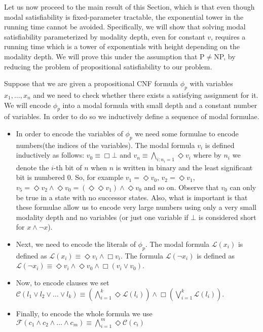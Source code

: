 \documentclass{llncs}
\begin{document}
Let us now proceed to the main result of this Section, which is that even
though modal satisfiability is fixed-parameter tractable, the exponential tower
in the running time cannot be avoided. Specifically, we will show that solving
modal satisfiability parameterized by modality depth, even for constant $v$, 
requires a running time which is a tower of exponentials with height depending
on the modality depth. We will prove this under the assumption that P$\neq$NP,
by reducing the problem of propositional satisfiability to our problem.

Suppose that we are given a propositional CNF formula $\phi_p$ with variables
$x_1,\ldots,x_n$ and we need to check whether there exists a satisfying
assignment for it.  We will encode $\phi_p$ into a modal formula with small
depth and a constant number of variables. In order to do so we inductively
define a sequence of modal formulae.

\newcommand{\LL}{\mathcal{L}} \newcommand{\CC}{\mathcal{C}}
\newcommand{\FF}{\mathcal{F}} \newcommand{\SSS}{\mathcal{S}}
\newcommand{\CCC}{\mathcal{CA}}


\begin{itemize}


\item In order to encode the variables of $\phi_p$ we need some formulae to
encode numbers(the indices of the variables). The modal formula
$v_i$ is defined inductively as follows: $v_0\equiv \Box \bot$ and
$v_n\equiv \bigwedge_{i:n_i=1} \Diamond v_i$ where by $n_i$ we
denote the $i$-th bit of $n$ when $n$ is written in binary and the
least significant bit is numbered 0. So, for example $v_1=\Diamond
v_0$, $v_2=\Diamond v_1$, $v_5=\Diamond v_2\land \Diamond v_0 =
(\Diamond\Diamond v_1) \land \Diamond v_0$ and so on.  Observe that
$v_0$ can only be true in a state with no successor states.  Also,
what is important is that these formulae allow us to encode very large numbers
using only a very small modality depth and no variables (or just one variable
if $\bot$ is considered short for $x\land\neg x$).

\item Next, we need to encode the literals of $\phi_p$. The modal formula
$\LL(x_i)$ is defined as $\LL(x_i)\equiv\Diamond v_i \land \Box v_i$. The
formula $\LL(\neg x_i)$ is defined as $\LL(\neg x_i)\equiv \Diamond v_i \land
\Diamond v_0 \land \Box \left( v_i \lor v_0 \right)$.

\item Now, to encode clauses we set $\CC(l_1\lor l_2\lor\ldots\lor l_k)\equiv
\left(\bigwedge_{i=1}^k \Diamond \LL(l_i)\right) \land \Box
\left(\bigvee_{i=1}^k \LL(l_i)\right)$.

\item Finally, to encode the whole formula we use $\FF(c_1\land
c_2\land\ldots\land c_m)\equiv\bigwedge_{i=1}^m \Diamond \CC(c_i)$

\end{itemize}
\end{document}
